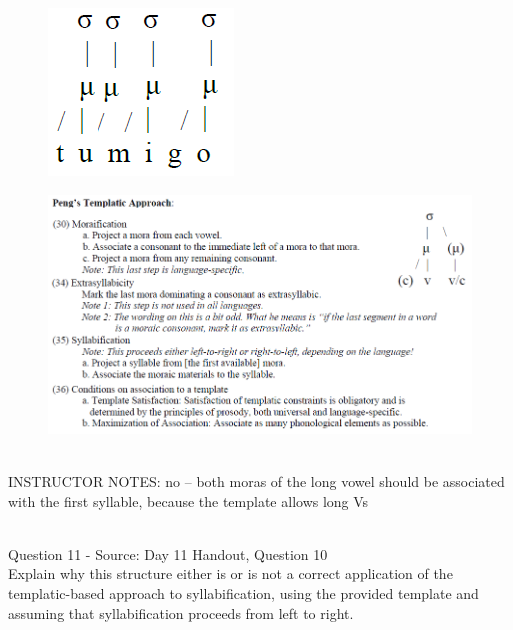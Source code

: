 \documentclass[12pt]{article}
\begin{document}
\begin{figure}[H]
\includegraphics{../images/pengtemplate_tuumigo_no.png}
\end{figure}
\begin{figure}[H]
\includegraphics{../images/peng_template_withdiagram.png}
\end{figure}

~\\
INSTRUCTOR NOTES: no -- both moras of the long vowel should be associated with the first syllable, because the template allows long Vs


~\\

{\large Question 11} - Source: Day 11 Handout, Question 10\\

Explain why this structure either is or is not a correct application of the templatic-based approach to syllabification, using the provided template and assuming that syllabification proceeds from left to right.\\
\end{document}
